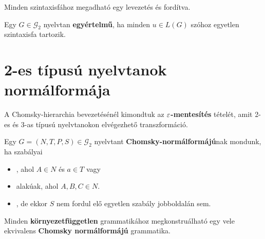 \begin{tcolorbox}
	\begin{proposition}
		Minden szintaxisfához megadható egy levezetés és fordítva.
	\end{proposition}
\end{tcolorbox}

\begin{tcolorbox}
	\begin{definition}
		Egy $G \in \mathcal{G}_2$ nyelvtan \textbf{egyértelmű}, ha minden $u \in L(G)$ szóhoz egyetlen szintaxisfa tartozik.
	\end{definition}
\end{tcolorbox}


\section{2-es típusú nyelvtanok normálformája}

A Chomsky-hierarchia bevezetésénél kimondtuk az \textbf{$\varepsilon$-mentesítés} tételét, amit 2-es és 3-as típusú nyelvtanokon elvégezhető transzformáció. 

\begin{tcolorbox}
	\begin{definition}
		Egy $G=(N,T,P,S) \in \mathcal{G}_2$ %
		nyelvtant \textbf{Chomsky-normálformájú}nak
		mondunk, ha szabályai
		\begin{itemize}
			\item {} , ahol $A \in N$ és $a \in T$ vagy
			\item {} alakúak, ahol $A, B, C \in N$.
			\item {} , de ekkor $S$ nem fordul elő egyetlen
			szabály jobboldalán sem.
		\end{itemize}
	\end{definition}
\end{tcolorbox}

\begin{tcolorbox}
	\begin{theorem}	
		Minden \textbf{környezetfüggetlen} grammatikához
		megkonstruálható egy vele ekvivalens \textbf{Chomsky
		normálformájú} grammatika.
	\end{theorem}
\end{tcolorbox}

